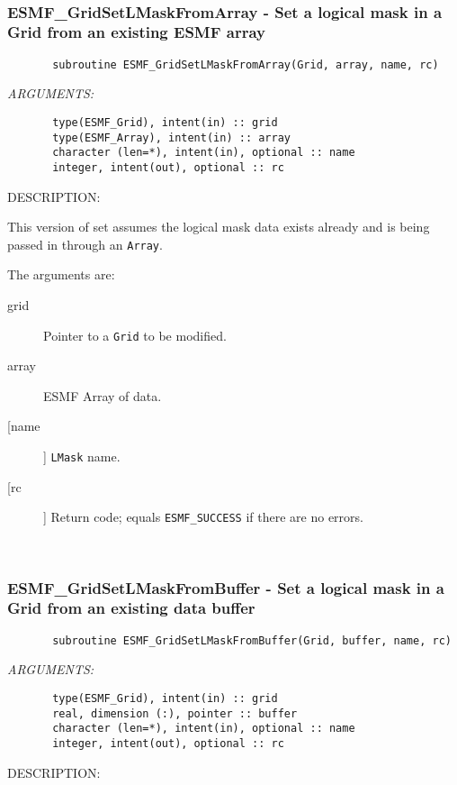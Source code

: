  
\mbox{}\hrulefill\ 
 
\subsubsection{ESMF\_GridSetLMaskFromArray - Set a logical mask in a Grid from an existing ESMF array}


 
\begin{verbatim}       subroutine ESMF_GridSetLMaskFromArray(Grid, array, name, rc)\end{verbatim}{\em ARGUMENTS:}
\begin{verbatim}       type(ESMF_Grid), intent(in) :: grid
       type(ESMF_Array), intent(in) :: array
       character (len=*), intent(in), optional :: name
       integer, intent(out), optional :: rc\end{verbatim}
{\sf DESCRIPTION:\\ }


       This version of set assumes the logical mask data exists already and is
       being passed in through an {\tt Array}.
  
       The arguments are:
       \begin{description}
       \item[grid]
            Pointer to a {\tt Grid} to be modified.
       \item[array]
            ESMF Array of data.
       \item [[name]]
             {\tt LMask} name.
       \item[[rc]]
            Return code; equals {\tt ESMF\_SUCCESS} if there are no errors.
       \end{description}
   
 
\mbox{}\hrulefill\ 
 
\subsubsection{ESMF\_GridSetLMaskFromBuffer - Set a logical mask in a Grid from an existing data buffer}


 
\begin{verbatim}       subroutine ESMF_GridSetLMaskFromBuffer(Grid, buffer, name, rc)\end{verbatim}{\em ARGUMENTS:}
\begin{verbatim}       type(ESMF_Grid), intent(in) :: grid
       real, dimension (:), pointer :: buffer
       character (len=*), intent(in), optional :: name
       integer, intent(out), optional :: rc\end{verbatim}
{\sf DESCRIPTION:\\ }


